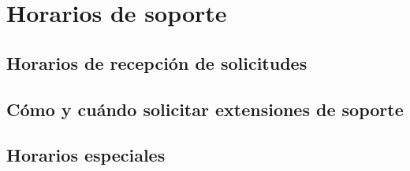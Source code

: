 \section{Horarios de soporte}
\label{horarios}

\subsection{Horarios de recepci\'on de solicitudes}


\subsection{C\'omo y cu\'ando solicitar extensiones de soporte}

\subsection{Horarios especiales}
